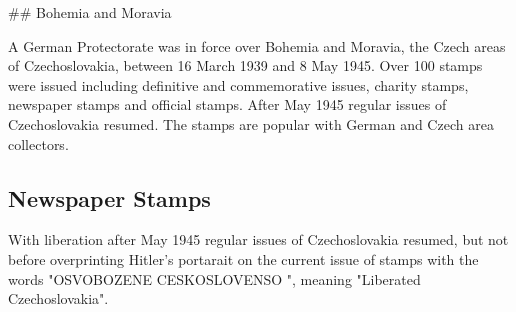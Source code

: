 
\#\# Bohemia and Moravia

A German Protectorate was in force over Bohemia and Moravia, the Czech areas of Czechoslovakia, between 16 March 1939 and 8 May 1945. Over 100 stamps were issued including definitive and commemorative issues, charity stamps, newspaper stamps and official stamps. After May 1945 regular issues of Czechoslovakia resumed. The stamps are popular with German and Czech area collectors.

\subsection{Newspaper Stamps}


With liberation after May 1945 regular issues of Czechoslovakia resumed, but not before overprinting Hitler's portarait on the current issue of stamps with the words "OSVOBOZENE CESKOSLOVENSO ", meaning "Liberated Czechoslovakia".


    